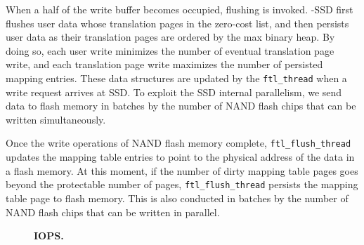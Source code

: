 When a half of the write buffer becomes occupied, flushing is invoked. \ours{}-SSD
first flushes user data whose translation pages in the zero-cost list, and then
persists user data as their translation pages are ordered by the max binary
heap. By doing so, each user write minimizes the number of eventual
translation page write, and each translation page write maximizes the number of
persisted mapping entries. These data structures are updated by the \texttt{ftl\_thread} 
when a write request arrives at SSD. 
To exploit the SSD internal parallelism, we send data to flash memory in
batches by the number of NAND flash chips that can be written simultaneously.

Once the write operations of NAND flash memory complete,
\texttt{ftl\_flush\_thread} updates the mapping table entries to point to the
physical address of the data in a flash memory.  At this moment, if the number
of dirty mapping table pages goes beyond the protectable number of pages,
\texttt{ftl\_flush\_thread} persists the mapping table page to flash memory.
This is also conducted in batches by the number of NAND flash chips that can be
written in parallel.

\begin{figure}[t]
    \centering{}
    \caption{\textbf{IOPS.}}
\end{figure} 

